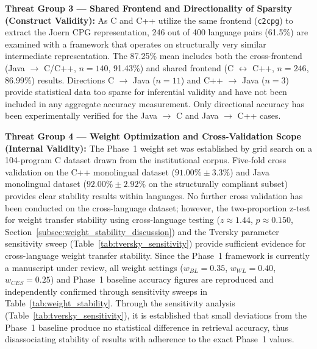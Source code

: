 \textbf{Threat Group 3 --- Shared Frontend and Directionality of Sparsity (Construct Validity):}
As C and C++ utilize the same frontend (\texttt{c2cpg}) to extract the Joern CPG representation, 246 out of 400 language pairs (61.5\%) are examined with a framework that operates on structurally very similar intermediate representation. The 87.25\% mean includes both the cross-frontend (Java $\rightarrow$ C/C++, $n=140$, 91.43\%) and shared frontend (C $\leftrightarrow$ C++, $n=246$, 86.99\%) results. Directions C $\rightarrow$ Java ($n=11$) and C++ $\rightarrow$ Java ($n=3$) provide statistical data too sparse for inferential validity and have not been included in any aggregate accuracy measurement. Only directional accuracy has been experimentally verified for the Java $\rightarrow$ C and Java $\rightarrow$ C++ cases.

\textbf{Threat Group 4 --- Weight Optimization and Cross-Validation Scope (Internal Validity):}
The Phase~1 weight set was established by grid search on a 104-program C dataset drawn from the institutional corpus. Five-fold cross validation on the C++ monolingual dataset ($91.00\% \pm 3.3\%$) and Java monolingual dataset ($92.00\% \pm 2.92\%$ on the structurally compliant subset) provides clear stability results within languages. No further cross validation has been conducted on the cross-language dataset; however, the two-proportion z-test for weight transfer stability using cross-language testing ($z \approx 1.44$, $p \approx 0.150$, Section~\ref{subsec:weight_stability_discussion}) and the Tversky parameter sensitivity sweep (Table~\ref{tab:tversky_sensitivity}) provide sufficient evidence for cross-language weight transfer stability. Since the Phase~1 framework is currently a manuscript under review, all weight settings ($w_{BL}=0.35$, $w_{WL}=0.40$, $w_{CES}=0.25$) and Phase~1 baseline accuracy figures are reproduced and independently confirmed through sensitivity sweeps in Table~\ref{tab:weight_stability}. Through the sensitivity analysis (Table~\ref{tab:tversky_sensitivity}), it is established that small deviations from the Phase~1 baseline produce no statistical difference in retrieval accuracy, thus disassociating stability of results with adherence to the exact Phase~1 values.

